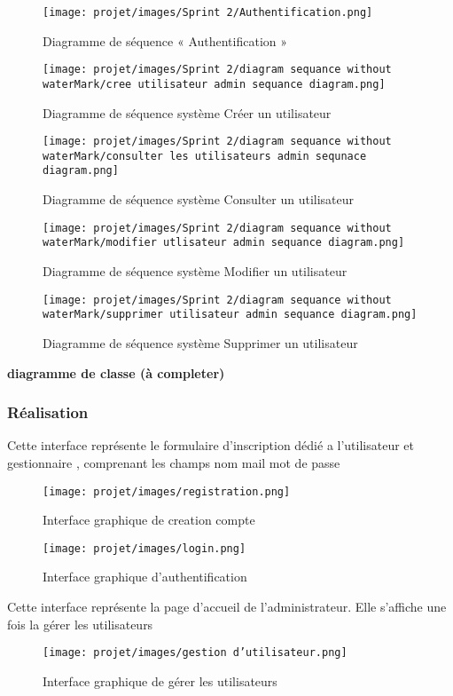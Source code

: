 \begin{figure}[H]
    \centering
    \texttt{[image: projet/images/Sprint 2/Authentification.png]}
    \caption{Diagramme de séquence « Authentification »}
    \label{fig:equipe_scrum}
\end{figure}
\clearpage
\begin{figure}[H]
    \centering
    \texttt{[image: projet/images/Sprint 2/diagram sequance without waterMark/cree utilisateur admin sequance diagram.png]}
    \caption{Diagramme de séquence système Créer un utilisateur}
    \label{fig:diagramme2}
\end{figure}
\begin{figure}[H]
    \centering
    \texttt{[image: projet/images/Sprint 2/diagram sequance without waterMark/consulter les utilisateurs admin sequnace diagram.png]}
    \caption{Diagramme de séquence système Consulter un utilisateur}
    \label{fig:diagramme3}
\end{figure}
\begin{figure}[H]
    \centering
    \texttt{[image: projet/images/Sprint 2/diagram sequance without waterMark/modifier utlisateur admin sequance diagram.png]}
    \caption{Diagramme de séquence système Modifier un utilisateur}
    \label{fig:diagramme4}
\end{figure}
\begin{figure}[H]
    \centering
    \texttt{[image: projet/images/Sprint 2/diagram sequance without waterMark/supprimer utilisateur admin sequance diagram.png]}
    \caption{Diagramme de séquence système Supprimer un utilisateur}
    \label{fig:diagramme5}
\end{figure}
\textbf{diagramme de classe (à completer)}
\subsubsection{Réalisation}
Cette interface représente le formulaire d’inscription dédié a l'utilisateur et gestionnaire , comprenant les champs nom mail mot de passe 
\begin{figure}[H]
    \centering
    \texttt{[image: projet/images/registration.png]}
    \caption{Interface graphique de creation compte}
    \label{fig:diagramme5}
\end{figure}
\begin{figure}[H]
    \centering
    \texttt{[image: projet/images/login.png]}
    \caption{Interface graphique d’authentification}
    \label{fig:diagramme5}
\end{figure}
\clearpage
Cette interface représente la page d’accueil de l’administrateur. Elle s’affiche une fois la gérer les utilisateurs
\begin{figure}[H]
    \centering
    \texttt{[image: projet/images/gestion d'utilisateur.png]}
    \caption{Interface graphique de gérer les utilisateurs }
    \label{fig:diagramme5}
\end{figure}


